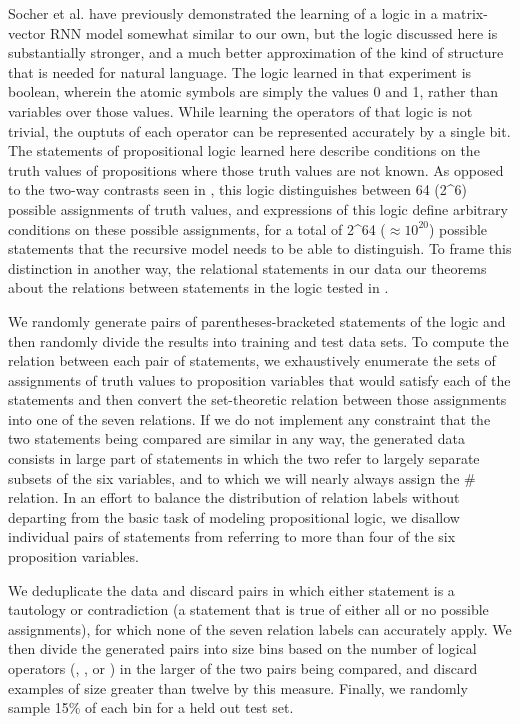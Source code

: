 
Socher et al. \cite{socher2012semantic} have previously demonstrated the learning of a logic in a matrix-vector RNN model somewhat similar to our own, but the logic discussed here is substantially stronger, and a much better approximation of the kind of structure that is needed for natural language. The logic learned in that experiment is boolean, wherein the atomic symbols are simply the values 0 and 1, rather than variables over those values. While learning the operators of that logic is not trivial, the ouptuts of each operator can be represented accurately by a single bit. The statements of propositional logic learned here describe conditions on the truth values of propositions where those truth values are not known. As opposed to the two-way contrasts seen in \cite{socher2012semantic}, this logic distinguishes between 64 (2^6) possible assignments of truth values, and expressions of this logic define arbitrary conditions on these possible assignments, for a total of 2^{64} ($\approx 10^{20}$) possible statements that the recursive model needs to be able to distinguish. To frame this distinction in another way, the relational statements in our data our theorems about the relations between statements in the logic tested in \cite{socher2012semantic}.

We randomly generate pairs of parentheses-bracketed statements of the logic and then randomly divide the results into training and test data sets. To compute the relation between each pair of statements, we exhaustively enumerate the sets of assignments of truth values to proposition variables that would satisfy each of the statements and then convert the set-theoretic relation between those assignments into one of the seven relations. If we do not implement any constraint that the two statements being compared are similar in any way, the generated data consists in large part of statements in which the two refer to largely separate subsets of the six variables, and to which we will nearly always assign the \# relation. In an effort to balance the distribution of relation labels without departing from the basic task of modeling propositional logic, we disallow individual pairs of statements from referring to more than four of the six proposition variables. 

We deduplicate the data and discard pairs in which either statement is a tautology or contradiction (a statement that is true of either all or no possible assignments), for which none of the seven relation labels can accurately apply. We then divide the generated pairs into size bins based on the number of logical operators (, , or ) in the larger of the two pairs being compared, and discard examples of size greater than twelve by this measure. Finally, we randomly sample 15\% of each bin for a held out test set. 


